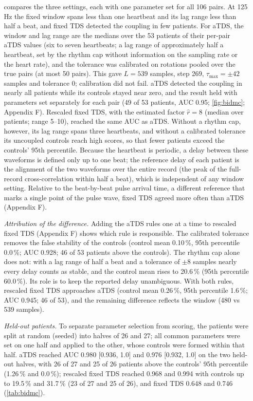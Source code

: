 \documentclass[11pt,a4paper]{article}
\begin{document}
 compares the three settings, each with one parameter set for all 106 pairs. At 125\,Hz the fixed window spans less than one heartbeat and its lag range less than half a beat, and fixed TDS detected the coupling in few patients. For aTDS, the window and lag range are the medians over the 53 patients of their per-pair aTDS values (six to seven heartbeats; a lag range of approximately half a heartbeat, set by the rhythm cap without information on the sampling rate or the heart rate), and the tolerance was calibrated on rotations pooled over the true pairs (at most 50 pairs). This gave $L = 539$ samples, step 269, $\tau_{\max} = \pm42$ samples and tolerance 0; calibration did not fail. aTDS detected the coupling in nearly all patients while its controls stayed near zero, and the result held with parameters set separately for each pair (49 of 53 patients, AUC 0.95; \cref{fig:bidmc}; Appendix F). Rescaled fixed TDS, with the estimated factor $\hat r = 8$ (median over patients; range 5--10), reached the same AUC as aTDS. Without a rhythm cap, however, its lag range spans three heartbeats, and without a calibrated tolerance its uncoupled controls reach high scores, so that fewer patients exceed the controls' 95th percentile. Because the heartbeat is periodic, a delay between these waveforms is defined only up to one beat; the reference delay of each patient is the alignment of the two waveforms over the entire record (the peak of the full-record cross-correlation within half a beat), which is independent of any window setting. Relative to the beat-by-beat pulse arrival time, a different reference that marks a single point of the pulse wave, fixed TDS agreed more often than aTDS (Appendix F).

\emph{Attribution of the difference.} Adding the aTDS rules one at a time to rescaled fixed TDS (Appendix F) shows which rule is responsible. The calibrated tolerance removes the false stability of the controls (control mean 0.10\,\%, 95th percentile 0.0\,\%; AUC 0.928; 46 of 53 patients above the controls). The rhythm cap alone does not: with a lag range of half a beat and a tolerance of $\pm8$ samples nearly every delay counts as stable, and the control mean rises to 20.6\,\% (95th percentile 60.0\,\%). Its role is to keep the reported delay unambiguous. With both rules, rescaled fixed TDS approaches aTDS (control mean 0.26\,\%, 95th percentile 1.6\,\%; AUC 0.945; 46 of 53), and the remaining difference reflects the window (480 vs 539 samples).

\emph{Held-out patients.} To separate parameter selection from scoring, the patients were split at random (seeded) into halves of 26 and 27; all common parameters were set on one half and applied to the other, whose controls were formed within that half. aTDS reached AUC 0.980 [0.936, 1.0] and 0.976 [0.932, 1.0] on the two held-out halves, with 26 of 27 and 25 of 26 patients above the controls' 95th percentile (1.26\,\% and 0.0\,\%); rescaled fixed TDS reached 0.968 and 0.994 with controls up to 19.5\,\% and 31.7\,\% (23 of 27 and 25 of 26), and fixed TDS 0.648 and 0.746 (\cref{tab:bidmc}).
\end{document}
